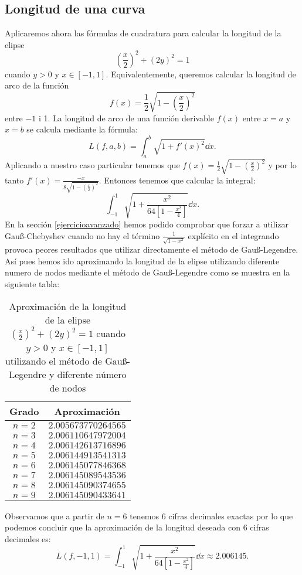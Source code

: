 \documentclass[a4paper]{article}
\begin{document}
\subsection*{Longitud de una curva}
Aplicaremos ahora las fórmulas de cuadratura para calcular la longitud de la elipse $$\left(\frac{x}{2}\right)^2+(2y)^2=1$$ cuando $y>0$ y $x\in[-1,1]$. Equivalentemente, queremos calcular la longitud de arco de la función $$f(x)=\frac{1}{2}\sqrt{1-\left(\frac{x}{2}\right)^2}$$ entre $-1$ i 1. La longitud de arco de una función derivable $f(x)$ entre $x=a$ y $x=b$ se calcula mediante la fórmula: $$L(f,a,b)=\int_a^b\sqrt{1+f'(x)^2}\dd x.$$ Aplicando a nuestro caso particular tenemos que $f(x)=\frac{1}{2}\sqrt{1-\left(\frac{x}{2}\right)^2}$ y por lo tanto $f'(x)=\frac{-x}{8\sqrt{1-\left(\frac{x}{2}\right)^2}}$. Entonces tenemos que calcular la integral: $$\int_{-1}^1\sqrt{1+\frac{x^2}{64\left[1-\frac{x^2}{4}\right]}}\dd x.$$ En la sección \ref{ejercicioavanzado} hemos podido comprobar que forzar a utilizar Gau\ss-Chebyshev cuando no hay el término $\frac{1}{\sqrt{1-x^2}}$ explícito en el integrando provoca peores resultados que utilizar directamente el método de Gau\ss-Legendre. Así pues hemos ido aproximando la longitud de la elipse utilizando diferente numero de nodos mediante el método de Gau\ss-Legendre como se muestra en la siguiente tabla:
\begin{table}[ht]
    \centering
    \begin{tabular}{|c|c|}
        \hline
        Grado & Aproximación\\
        \hline
        $n=2$ & $2.005673770264565$ \\
        \hline
        $n=3$ & $2.006110647972004$ \\
        \hline
        $n=4$ & $2.006142613716896$ \\
        \hline
        $n=5$ & $2.006144913541313$ \\
        \hline
        $n=6$ & $2.006145077846368$ \\
        \hline
        $n=7$ & $2.006145089543536$ \\
        \hline
        $n=8$ & $2.006145090374655$ \\
        \hline
        $n=9$ & $2.006145090433641$ \\
        \hline
    \end{tabular}
    \caption{Aproximación de la longitud de la elipse $\left(\frac{x}{2}\right)^2+(2y)^2=1$ cuando $y>0$ y $x\in[-1,1]$ utilizando el método de Gau\ss-Legendre y diferente número de nodos}
\end{table}\par
Observamos que a partir de $n=6$ tenemos 6 cifras decimales exactas por lo que podemos concluir que la aproximación de la longitud deseada con 6 cifras decimales es: $$L(f,-1,1)=\int_{-1}^1\sqrt{1+\frac{x^2}{64\left[1-\frac{x^2}{4}\right]}}\dd x\approx 2.006145.$$
\end{document}
